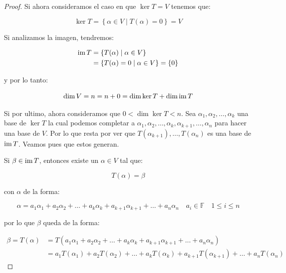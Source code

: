 \begin{proof}
			Si ahora consideramos el caso en que $\ker{T} = V$ tenemos que:

			\begin{equation*}
				\ker{T} = \left\{ \alpha \in V \mid T(\alpha) = 0 \right\} = V
			\end{equation*}

			Si analizamos la imagen, tendremos:

			\begin{align*}
				\operatorname{im}{T} &= \left\{ T(\alpha) \mid \alpha \in V \right\} \\
				&= \left\{ T(\alpha) = 0 \mid \alpha \in V \right\} = \{0\}
			\end{align*}

			y por lo tanto:

			\begin{equation*}
				\dim{V} = n = n + 0 = \dim{\ker{T}} + \dim{\operatorname{im}{T}}
			\end{equation*}

			Si por ultimo, ahora consideramos que $0 < \dim{\ker{T}} < n$.
			Sea $\alpha_1, \alpha_2, \dots, \alpha_k$ una base de $\ker{T}$ la cual podemos completar a $\alpha_1, \alpha_2, \dots, \alpha_k, \alpha_{k+1}, \dots, \alpha_n$ para hacer una base de $V$.
			Por lo que resta por ver que $T(\alpha_{k+1}), \dots, T(\alpha_n)$ es una base de $\operatorname{im}{T}$.
			Veamos pues que estos generan.

			Si $\beta \in \operatorname{im}{T}$, entonces existe un $\alpha \in V$ tal que:

			\begin{equation*}
				T(\alpha) = \beta
			\end{equation*}

			con $\alpha$ de la forma:

			\begin{equation*}
				\alpha = a_1 \alpha_1 + a_2 \alpha_2 + \dots + a_k \alpha_k + a_{k+1} \alpha_{k+1} + \dots + a_n \alpha_n \quad a_i \in \mathbb{F} \quad 1 \leq i \leq n
			\end{equation*}

			por lo que $\beta$ queda de la forma:

			\begin{align*}
				\beta = T(\alpha) &= T(a_1 \alpha_1 + a_2 \alpha_2 + \dots + a_k \alpha_k + a_{k+1} \alpha_{k+1} + \dots + a_n \alpha_n) \\
				&= a_1 T(\alpha_1) + a_2 T(\alpha_2) + \dots + a_k T(\alpha_k) + a_{k+1} T(\alpha_{k+1}) + \dots + a_n T(\alpha_n)
			\end{align*}


\end{proof}
